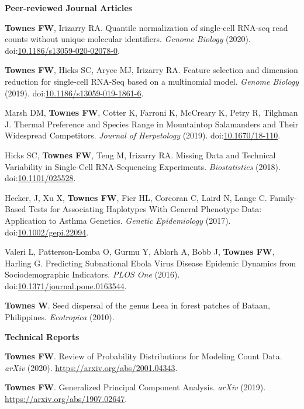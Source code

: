 \documentclass[10pt]{article}
\newcommand\doilink[1]{\href{https://dx.doi.org/#1}{#1}}
\newcommand\doi[1]{doi:\doilink{#1}}
\newcommand\arxiv[1]{\url{https://arxiv.org/abs/#1}}
\begin{document}
\textbf{Peer-reviewed Journal Articles}
\begin{enumerate}[label= {[\arabic*]}]
\item {\bf Townes FW}, Irizarry RA. Quantile normalization of single-cell RNA-seq read counts without unique molecular identifiers. {\it Genome Biology} (2020). \doi{10.1186/s13059-020-02078-0}.
\item {\bf Townes FW}, Hicks SC, Aryee MJ, Irizarry RA. Feature selection and dimension reduction for single-cell RNA-Seq based on a multinomial model. {\it Genome Biology} (2019). \doi{10.1186/s13059-019-1861-6}.
\item Marsh DM, {\bf Townes FW}, Cotter K, Farroni K, McCreary K, Petry R, Tilghman J. Thermal Preference and Species Range in Mountaintop Salamanders and Their Widespread Competitors. {\it Journal of Herpetology} (2019). \doi{10.1670/18-110}.
\item Hicks SC, {\bf Townes FW}, Teng M, Irizarry RA. Missing Data and Technical Variability in Single-Cell RNA-Sequencing Experiments. {\it Biostatistics} (2018). \doi{10.1101/025528}.
\item Hecker, J, Xu X, {\bf Townes FW}, Fier HL, Corcoran C, Laird N, Lange C. Family-Based Tests for Associating Haplotypes With General Phenotype Data: Application to Asthma Genetics. {\it Genetic Epidemiology} (2017). \doi{10.1002/gepi.22094}.
\item Valeri L, Patterson-Lomba O, Gurmu Y, Ablorh A, Bobb J, {\bf Townes FW}, Harling G. Predicting Subnational Ebola Virus Disease Epidemic Dynamics from Sociodemographic Indicators. {\it PLOS One} (2016). \doi{10.1371/journal.pone.0163544}.
\item {\bf Townes W}. Seed dispersal of the genus Leea in forest patches of Bataan, Philippines. {\it Ecotropica } (2010).
\end{enumerate}

\textbf{Technical Reports}
\begin{enumerate}[label= {[\arabic*]}]
\item {\bf Townes FW}. Review of Probability Distributions for Modeling Count Data. {\it arXiv} (2020). \arxiv{2001.04343}.
\item {\bf Townes FW}. Generalized Principal Component Analysis. {\it arXiv} (2019). \arxiv{1907.02647}.
\end{enumerate}
\end{document}
